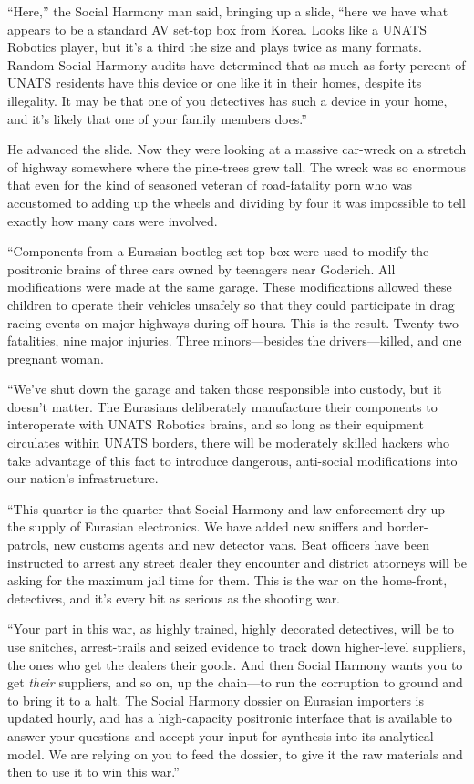 “Here,” the Social Harmony man said, bringing up a slide, “here we
have what appears to be a standard AV set-top box from Korea. Looks
like a UNATS Robotics player, but it’s a third the size and plays
twice as many formats. Random Social Harmony audits have determined
that as much as forty percent of UNATS residents have this device
or one like it in their homes, despite its illegality. It may be
that one of you detectives has such a device in your home, and it’s
likely that one of your family members does.”

He advanced the slide. Now they were looking at a massive car-wreck
on a stretch of highway somewhere where the pine-trees grew tall.
The wreck was so enormous that even for the kind of seasoned
veteran of road-fatality porn who was accustomed to adding up the
wheels and dividing by four it was impossible to tell exactly how
many cars were involved.

“Components from a Eurasian bootleg set-top box were used to modify
the positronic brains of three cars owned by teenagers near
Goderich. All modifications were made at the same garage. These
modifications allowed these children to operate their vehicles
unsafely so that they could participate in drag racing events on
major highways during off-hours. This is the result. Twenty-two
fatalities, nine major injuries. Three minors—besides the
drivers—killed, and one pregnant woman.

“We’ve shut down the garage and taken those responsible into
custody, but it doesn’t matter. The Eurasians deliberately
manufacture their components to interoperate with UNATS Robotics
brains, and so long as their equipment circulates within UNATS
borders, there will be moderately skilled hackers who take
advantage of this fact to introduce dangerous, anti-social
modifications into our nation’s infrastructure.

“This quarter is the quarter that Social Harmony and law
enforcement dry up the supply of Eurasian electronics. We have
added new sniffers and border-patrols, new customs agents and new
detector vans. Beat officers have been instructed to arrest any
street dealer they encounter and district attorneys will be asking
for the maximum jail time for them. This is the war on the
home-front, detectives, and it’s every bit as serious as the
shooting war.

“Your part in this war, as highly trained, highly decorated
detectives, will be to use snitches, arrest-trails and seized
evidence to track down higher-level suppliers, the ones who get the
dealers their goods. And then Social Harmony wants you to get
\emph{their} suppliers, and so on, up the chain—to run the
corruption to ground and to bring it to a halt. The Social Harmony
dossier on Eurasian importers is updated hourly, and has a
high-capacity positronic interface that is available to answer your
questions and accept your input for synthesis into its analytical
model. We are relying on you to feed the dossier, to give it the
raw materials and then to use it to win this war.”

